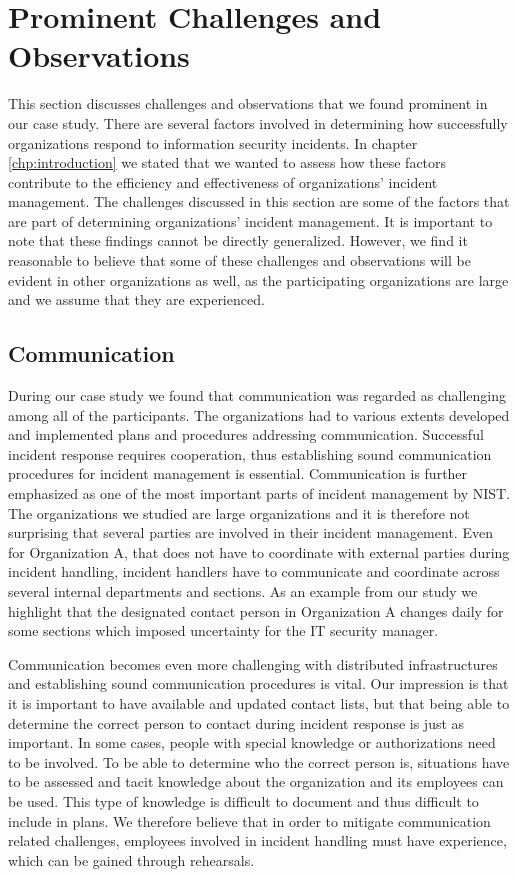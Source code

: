 \section{Prominent Challenges and Observations}
\label{sec:discussionStructures}
This section discusses challenges and observations that we found prominent in our case study. There are several factors involved in determining how successfully organizations respond to information security incidents. In chapter \ref{chp:introduction} we stated that we wanted to assess how these factors contribute to the efficiency and effectiveness of organizations' incident management. The challenges discussed in this section are some of the factors that are part of determining organizations' incident management. It is important to note that these findings cannot be directly generalized. However, we find it reasonable to believe that some of these challenges and observations will be evident in other organizations as well, as the participating organizations are large and we assume that they are experienced.  

\subsection{Communication}
During our case study we found that communication was regarded as challenging among all of the participants. The organizations had to various extents developed and implemented plans and procedures addressing communication. Successful incident response requires cooperation, thus establishing sound communication procedures for incident management is essential. Communication is further emphasized as one of the most important parts of incident management by NIST. The organizations we studied are large organizations and it is therefore not surprising that several parties are involved in their incident management. Even for Organization A, that does not have to coordinate with external parties during incident handling, incident handlers have to communicate and coordinate across several internal departments and sections. As an example from our study we highlight that the designated contact person in Organization A changes daily for some sections which imposed uncertainty for the IT security manager. 

Communication becomes even more challenging with distributed infrastructures and establishing sound communication procedures is vital. Our impression is that it is important to have available and updated contact lists, but that being able to determine the correct person to contact during incident response is just as important. In some cases, people with special knowledge or authorizations need to be involved. To be able to determine who the correct person is, situations have to be assessed and tacit knowledge about the organization and its employees can be used. This type of knowledge is difficult to document and thus difficult to include in plans. We therefore believe that in order to mitigate communication related challenges, employees involved in incident handling must have experience, which can be gained through rehearsals. 

